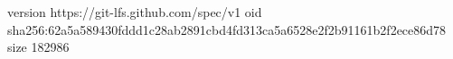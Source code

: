 version https://git-lfs.github.com/spec/v1
oid sha256:62a5a589430fddd1c28ab2891cbd4fd313ca5a6528e2f2b91161b2f2ece86d78
size 182986

